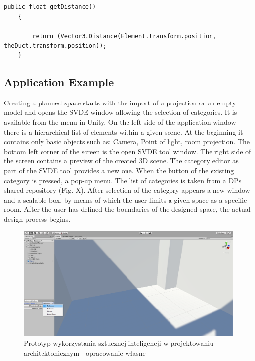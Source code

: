 \documentclass[runningheads]{llncs}
\begin{document}
\begin{lstlisting}[language={[Sharp]C}, caption={C\# exaple}, label={Script}]
public float getDistance()
    {

        return (Vector3.Distance(Element.transform.position, theDuct.transform.position));
    }
\end{lstlisting}

\subsection{Application Example}
Creating a planned space starts with the import of a projection or an empty model and opens the SVDE window allowing the selection of categories. It is available from the menu in Unity. On the left side of the application window there is a hierarchical list of elements within a given scene. At the beginning it contains only basic objects such as: Camera, Point of light, room projection. The bottom left corner of the screen is the open SVDE tool window. The right side of the screen contains a preview of the created 3D scene. The category editor as part of the SVDE tool provides a new one. When the button of the existing category is pressed, a pop-up menu. The list of categories is taken from a DPs shared repository (Fig. X). After selection of the category appears a new window and a scalable box, by means of which the user limits a given space as a specific room. After the user has defined the boundaries of the designed space, the actual design process begins.

\begin{figure}[H]
\centering
\includegraphics[width=\textwidth]{editor1.png}
\caption{Prototyp wykorzystania sztucznej inteligencji w projektowaniu architektonicznym - 
opracowanie własne} \label{fig3}
\end{figure}
\end{document}
